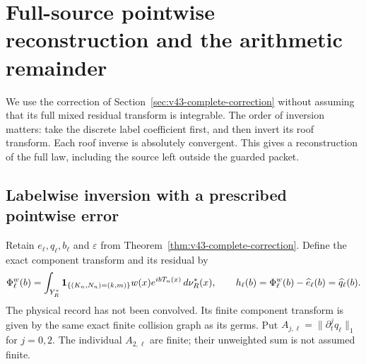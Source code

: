 \section{Full-source pointwise reconstruction and the arithmetic remainder}
\label{sec:v43-full-source-inversion}
We use the correction of Section~\ref{sec:v43-complete-correction}
without assuming that its full mixed residual transform is integrable.
The order of inversion matters: take the discrete label coefficient
first, and then invert its roof transform. Each roof inverse is
absolutely convergent. This gives a reconstruction of the full law,
including the source left outside the guarded packet.

\subsection{Labelwise inversion with a prescribed pointwise error}
Retain $e_\ell,q_\ell,b_\ell$ and $\varepsilon$ from
Theorem~\ref{thm:v43-complete-correction}. Define the exact component
transform and its residual by
\begin{equation}\label{eq:v43-component-transform}
 \Phi_\ell^w(b)=\int_{Y_R^*}\one_{\{(K_n,N_n)=(k,m)\}}
                      w(x)e^{ibT_n(x)}\,d\nu_R^*(x),\qquad
 h_\ell(b)=\Phi_\ell^w(b)-\widehat e_\ell(b)=\widehat q_\ell(b).
\end{equation}
The physical record has not been convolved. Its finite component
transform is given by the same exact finite collision graph as its
germs. Put $A_{j,\ell}=\|\partial_t^j q_\ell\|_1$ for $j=0,2$.
The individual $A_{2,\ell}$ are finite; their unweighted sum is not
assumed finite.

